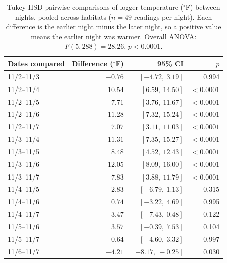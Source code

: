 \begin{table}[H]
\centering
\caption{Tukey HSD pairwise comparisons of logger temperature ($^{\circ}$F) between nights, pooled across habitats ($n = 49$ readings per night). Each difference is the earlier night minus the later night, so a positive value means the earlier night was warmer. Overall ANOVA: $F(5, 288) = 28.26$, $p < 0.0001$.}
\label{tab:tukey_temp}
\begin{tabular}{@{}lrrr@{}}
\toprule
Dates compared & Difference ($^{\circ}$F) & 95\% CI & $p$ \\
\midrule
11/2--11/3 & $-0.76$ & $[-4.72,\ 3.19]$ & 0.994 \\
11/2--11/4 & $10.54$ & $[6.59,\ 14.50]$ & $<0.0001$ \\
11/2--11/5 & $7.71$ & $[3.76,\ 11.67]$ & $<0.0001$ \\
11/2--11/6 & $11.28$ & $[7.32,\ 15.24]$ & $<0.0001$ \\
11/2--11/7 & $7.07$ & $[3.11,\ 11.03]$ & $<0.0001$ \\
11/3--11/4 & $11.31$ & $[7.35,\ 15.27]$ & $<0.0001$ \\
11/3--11/5 & $8.48$ & $[4.52,\ 12.43]$ & $<0.0001$ \\
11/3--11/6 & $12.05$ & $[8.09,\ 16.00]$ & $<0.0001$ \\
11/3--11/7 & $7.83$ & $[3.88,\ 11.79]$ & $<0.0001$ \\
11/4--11/5 & $-2.83$ & $[-6.79,\ 1.13]$ & 0.315 \\
11/4--11/6 & $0.74$ & $[-3.22,\ 4.69]$ & 0.995 \\
11/4--11/7 & $-3.47$ & $[-7.43,\ 0.48]$ & 0.122 \\
11/5--11/6 & $3.57$ & $[-0.39,\ 7.53]$ & 0.104 \\
11/5--11/7 & $-0.64$ & $[-4.60,\ 3.32]$ & 0.997 \\
11/6--11/7 & $-4.21$ & $[-8.17,\ -0.25]$ & 0.030 \\
\bottomrule
\end{tabular}
\end{table}
